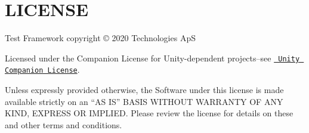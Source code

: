 \chapter{LICENSE}
\hypertarget{md__hey_tea_9_2_library_2_package_cache_2com_8unity_8test-framework_0d1_81_833_2_l_i_c_e_n_s_e}{}\label{md__hey_tea_9_2_library_2_package_cache_2com_8unity_8test-framework_0d1_81_833_2_l_i_c_e_n_s_e}
Test Framework copyright © 2020  Technologies ApS

Licensed under the  Companion License for Unity-\/dependent projects--see \href{http://www.unity3d.com/legal/licenses/Unity_Companion_License}{\texttt{ Unity Companion License}}.

Unless expressly provided otherwise, the Software under this license is made available strictly on an “\+AS IS” BASIS WITHOUT WARRANTY OF ANY KIND, EXPRESS OR IMPLIED. Please review the license for details on these and other terms and conditions. 